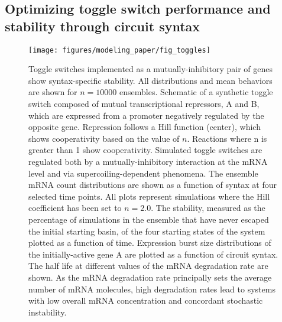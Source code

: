 \documentclass[11pt]{article}
\begin{document}
\subsection{Optimizing toggle switch performance and stability through circuit syntax}
\begin{figure}[htbp]
    \centering
    {\texttt{[image: figures/modeling\_paper/fig\_toggles]}
    \label{fig:toggle_cartoon}
    \label{fig:toggle_basin_stability_over_time}
    \label{fig:toggle_stable_frac_n_2.0}
    \label{fig:toggle_burst_size}
    \label{fig:toggle_half_life_vs_mRNA_deg}
    }
\end{figure}
\begin{figure}[htbp]
    \ContinuedFloat
    \caption{Toggle switches implemented as a mutually-inhibitory pair of genes show syntax-specific stability. All distributions and mean behaviors are shown for \(n=10000\) ensembles.
     Schematic of a synthetic toggle switch composed of mutual transcriptional repressors, A and B, which are expressed from a promoter negatively regulated by the opposite gene. Repression follows a Hill function (center), which shows cooperativity based on the value of \(n\). Reactions where n is greater than 1 show cooperativity. Simulated toggle switches are regulated both by a mutually-inhibitory interaction at the mRNA level and via supercoiling-dependent phenomena.
     The ensemble mRNA count distributions are shown as a function of syntax at four selected time points.   All plots represent simulations where the Hill coefficient has been set to \(n = 2.0\).
     The stability, measured as the percentage of simulations in the ensemble that have never escaped the initial starting basin, of the four starting states of the system plotted as a function of time. 
     Expression burst size distributions of the initially-active gene A are plotted as a function of circuit syntax. 
     The half life at different values of the mRNA degradation rate are shown. As the mRNA degradation rate principally sets the average number of mRNA molecules, high degradation rates lead to systems with low overall mRNA concentration and concordant stochastic instability.
} \label{fig:top:toggle_switch}
\end{figure}
\end{document}
